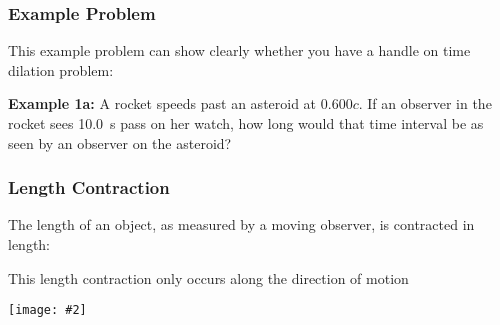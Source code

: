 \documentclass[12pt,compress,aspectratio=169]{beamer}
\newcommand{\pic}[2]{\texttt{[image: \#2]}}
\newcommand{\bigsqrt}{\ensuremath\sqrt{1-\left(\frac{v}{c}\right)^2}}
\newcommand{\lorentz}{\ensuremath\frac{1}{\bigsqrt}}
\newcommand{\eq}[2]{\vspace{#1}{\Large\begin{displaymath}#2\end{displaymath}}}
\begin{document}
\begin{frame}
  \frametitle{Example Problem}

  This example problem can show clearly whether you have a handle on
  time dilation problem:
  
  \vspace{.2in}
  \textbf{Example 1a:} A rocket speeds past an asteroid at $0.600c$. If an
  observer in the rocket sees \SI{10.0}{s} pass on her watch, how long would
  that time interval be as seen by an observer on the asteroid?


\end{frame}


\begin{frame}
  \frametitle{Length Contraction}
  The length of an object, as measured by a moving observer, is contracted in
  length:
  
  \eq{-.35in}{
    \boxed{L'=L\bigsqrt=\frac{L}{\gamma}}
  }
  
  This length contraction only occurs along the direction of motion
  \begin{center}
    \pic{.6}{graphics/baseball-contraction.jpg}
    \end{center}
\end{frame}



%
%
%  
%  
\end{document}
